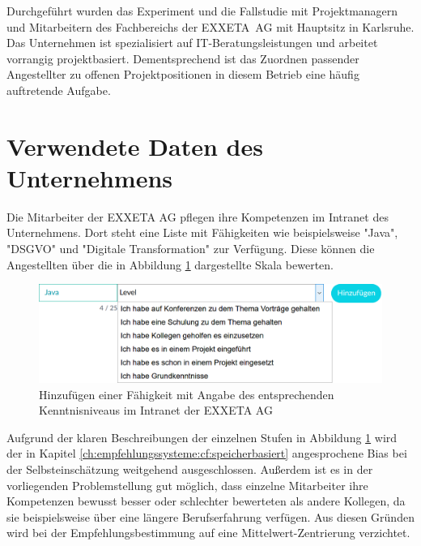 Durchgeführt wurden das Experiment und die Fallstudie mit Projektmanagern und Mitarbeitern des Fachbereichs \JES der \mbox{EXXETA AG} mit Hauptsitz in Karlsruhe. Das Unternehmen ist spezialisiert auf IT-Beratungsleistungen und arbeitet vorrangig projektbasiert. Dementsprechend ist das Zuordnen passender Angestellter zu offenen Projektpositionen in diesem Betrieb eine häufig auftretende Aufgabe.

\section{Verwendete Daten des Unternehmens}
\label{ch:methodik:versuchsaufbau}
Die Mitarbeiter der EXXETA AG pflegen ihre Kompetenzen im Intranet des Unternehmens. Dort steht eine Liste mit \anzFaehigkeiten Fähigkeiten wie beispielsweise "Java", "DSGVO" und "Digitale Transformation" zur Verfügung. Diese können die Angestellten über die in Abbildung \ref{fig:methodik:versuchsaufbau:daten:abb1} dargestellte Skala bewerten.

\begin{figure}[h]
	\centering
	\includegraphics[width=1\textwidth]{gfx/skill-level.png}
	\caption{Hinzufügen einer Fähigkeit mit Angabe des entsprechenden Kenntnisniveaus im Intranet der EXXETA AG}
	\label{fig:methodik:versuchsaufbau:daten:abb1}
\end{figure}

Aufgrund der klaren Beschreibungen der einzelnen Stufen in Abbildung \ref{fig:methodik:versuchsaufbau:daten:abb1} wird der in Kapitel \ref{ch:empfehlungssysteme:cf:speicherbasiert} angesprochene Bias bei der Selbsteinschätzung weitgehend ausgeschlossen. Außerdem ist es in der vorliegenden Problemstellung gut möglich, dass einzelne Mitarbeiter ihre Kompetenzen bewusst besser oder schlechter bewerteten als andere Kollegen, da sie beispielsweise über eine längere Berufserfahrung verfügen. Aus diesen Gründen wird bei der Empfehlungsbestimmung auf eine Mittelwert-Zentrierung verzichtet.

